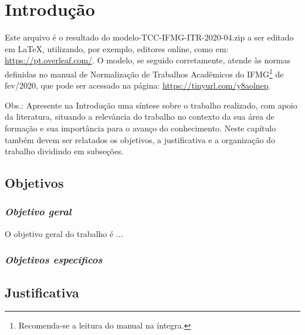 \chapter{Introdução} \label{Introducao}

Este arquivo é o resultado do modelo-TCC-IFMG-ITR-2020-04.zip a ser editado em LaTeX, utilizando, por exemplo, editores online, como em: \url{https://pt.overleaf.com/}. O modelo, se seguido corretamente, atende às normas definidas no manual de Normalização de Trabalhos Acadêmicos do IFMG\footnote{Recomenda-se a leitura do manual na íntegra.} de fev/2020, que pode ser acessado na página: \url{https://tinyurl.com/y8aolnep}. 

Obs.: Apresente na Introdução uma síntese sobre o trabalho realizado, com apoio da literatura, situando a relevância do trabalho no contexto da sua área de formação e sua importância para o avanço do conhecimento. Neste capítulo também devem ser relatados os objetivos, a justificativa e a organização do trabalho dividindo em subseções. 



\section{Objetivos}

\subsection{\textit{Objetivo geral}}

O objetivo geral do trabalho é ...

\subsection{\textit{Objetivos específicos}}

\section{Justificativa}

